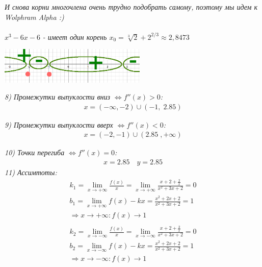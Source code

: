 \documentclass[a4paper,11pt]{article}
\begin{document}
\textit{\footnotesize И снова корни многочлена очень трудно подобрать самому, поэтому мы идем к Wolphram Alpha :)} \\[4pt] \\
$ x^3 - 6x - 6 $ \textit{ - имеет один корень $ x_0 = \sqrt[3]{2} + 2^{2/3} \approx 2,8473$} \\
\begin{center}
	\includegraphics[width = 70mm]{images/93.png}
\end{center}
\noindent \textsl{8) Промежутки  выпуклости вниз $\Longleftrightarrow f''(x) > 0 $:}
\begin{gather*}
x = (-\infty, -2) \cup (-1, \; 2.85)
\end{gather*}

\noindent \textsl{9) Промежутки  выпуклости вверх $\Longleftrightarrow f''(x) < 0 $:}
\begin{gather*}
x = (-2, -1) \cup (2.85 \; , +\infty) 
\end{gather*}

\noindent \textsl{10) Точки перегиба   $\Longleftrightarrow f''(x) = 0 $:}
\begin{align*}
x = 2.85 \quad y = 2.85
\end{align*}
\noindent \textsl{11) Ассимтоты:}
\begin{gather*}
	k_1 = \lim_{x \to +\infty} \frac{f(x)}{x} = \lim_{x \to +\infty} \frac{x + 2 + \frac{2}{x}}{x^2 + 3x + 2} = 0 \\
	b_1 = \lim_{x \to +\infty} f(x) - kx = \frac{x^2 + 2x + 2}{x^2 + 3x + 2} = 1 \\
	\Rightarrow x \to +\infty: f(x) \to 1 \\ \\
	k_2 = \lim_{x \to -\infty} \frac{f(x)}{x} = \lim_{x \to -\infty} \frac{x + 2 + \frac{2}{x}}{x^2 + 3x + 2} = 0 \\
	b_2 = \lim_{x \to -\infty} f(x) - kx = \frac{x^2 + 2x + 2}{x^2 + 3x + 2} = 1 \\
	\Rightarrow x \to -\infty: f(x) \to 1 \\
\end{gather*}
\newpage



\end{document}
